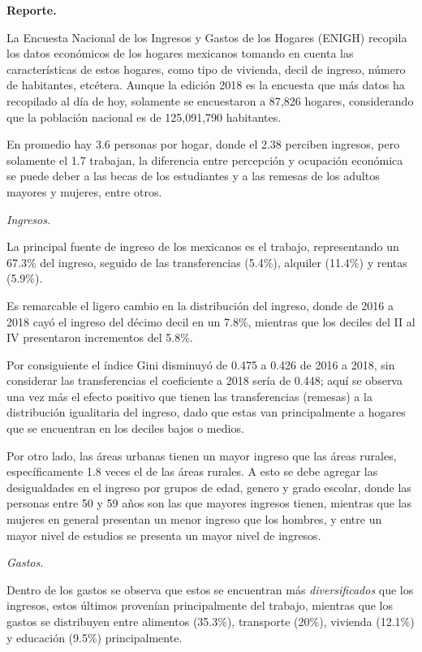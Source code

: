 \textbf{Reporte.}

La Encuesta Nacional de los Ingresos y Gastos de los Hogares (ENIGH) recopila los datos económicos de los hogares mexicanos tomando en cuenta las características de estos hogares, como tipo de vivienda, decil de ingreso, número de habitantes, etcétera. Aunque la edición 2018 es la encuesta que más datos ha recopilado al día de hoy, solamente se encuestaron a 87,826 hogares, considerando que la población nacional es de 125,091,790 habitantes.

En promedio hay 3.6 personas por hogar, donde el 2.38 perciben ingresos, pero solamente el 1.7 trabajan, la diferencia entre percepción y ocupación económica se puede deber a las becas de los estudiantes y a las remesas de los adultos mayores y mujeres, entre otros.

\textit{Ingresos.}

La principal fuente de ingreso de los mexicanos es el trabajo, representando un 67.3\% del ingreso, seguido de las transferencias (5.4\%), alquiler (11.4\%) y rentas (5.9\%).

Es remarcable el ligero cambio en la distribución del ingreso, donde de 2016 a 2018 cayó el ingreso del décimo decil en un 7.8\%, mientras que los deciles del II al IV presentaron incrementos del 5.8\%.

Por consiguiente el índice Gini disminuyó de 0.475 a 0.426 de 2016 a 2018, sin considerar las transferencias el coeficiente a 2018 sería de 0.448; aquí se observa una vez más el efecto positivo que tienen las transferencias (remesas) a la distribución igualitaria del ingreso, dado que estas van principalmente a hogares que se encuentran en los deciles bajos o medios.

Por otro lado, las áreas urbanas tienen un mayor ingreso que las áreas rurales, específicamente 1.8 veces el de las áreas rurales. A esto se debe agregar las desigualdades en el ingreso por grupos de edad, genero y grado escolar, donde las personas entre 50 y 59 años son las que mayores ingresos tienen, mientras que las mujeres en general presentan un menor ingreso que los hombres, y entre un mayor nivel de estudios se presenta un mayor nivel de ingresos.

\textit{Gastos.}

Dentro de los gastos se observa que estos se encuentran más \textit{diversificados} que los ingresos, estos últimos provenían principalmente del trabajo, mientras que los gastos se distribuyen entre alimentos (35.3\%), transporte (20\%), vivienda (12.1\%) y educación (9.5\%) principalmente.

